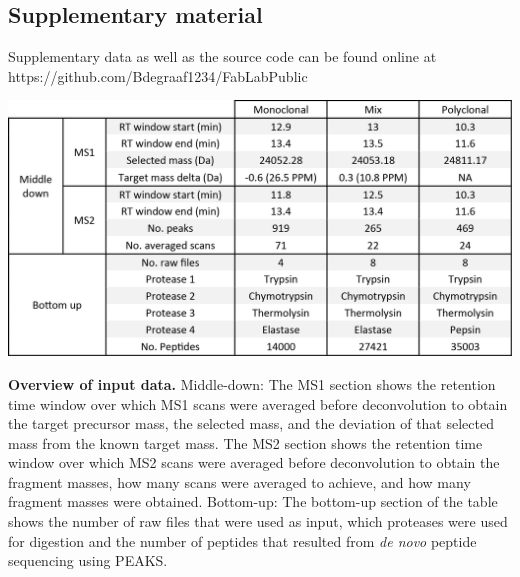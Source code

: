 \clearpage
\begin{subappendices}
  \beginsupplement


  \section{Supplementary material}
  Supplementary data as well as the source code can be found online at\\
  https://github.com/Bdegraaf1234/FabLabPublic

  \begin{table}[!hbt]
    \includegraphics[]{Chapter.5/Figures/ts1.png}
    \caption{
      \textbf{Overview of input data.} Middle-down: The MS1 section shows the retention time window over which MS1 scans were averaged before deconvolution to obtain the target precursor mass, the selected mass, and the deviation of that selected mass from the known target mass. The MS2 section shows the retention time window over which MS2 scans were averaged before deconvolution to obtain the fragment masses, how many scans were averaged to achieve, and how many fragment masses were obtained. Bottom-up: The bottom-up section of the table shows the number of raw files that were used as input, which proteases were used for digestion and the number of peptides that resulted from \emph{de novo} peptide sequencing using PEAKS.
    }
    \label{tab:tabs5.1}
  \end{table}
  \begin{figure}[!htb]
    \center

\end{figure}
\end{subappendices}
